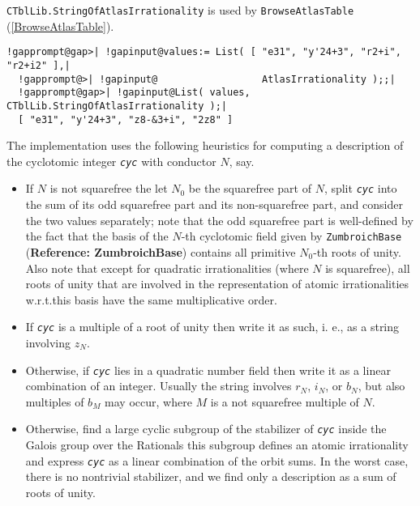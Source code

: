 \documentclass[a4paper,11pt]{report}
\begin{document}
{{{ \texttt{CTblLib.StringOfAtlasIrrationality} is used by \texttt{BrowseAtlasTable} (\ref{BrowseAtlasTable}). 

 
\begin{Verbatim}[commandchars=!@|,fontsize=\small,frame=single,label=Example]
  !gapprompt@gap>| !gapinput@values:= List( [ "e31", "y'24+3", "r2+i", "r2+i2" ],|
  !gapprompt@>| !gapinput@                  AtlasIrrationality );;|
  !gapprompt@gap>| !gapinput@List( values, CTblLib.StringOfAtlasIrrationality );|
  [ "e31", "y'24+3", "z8-&3+i", "2z8" ]
\end{Verbatim}
 

 The implementation uses the following heuristics for computing a description
of the cyclotomic integer \mbox{\texttt{\mdseries\slshape cyc}} with conductor $N$, say. 

 
\begin{itemize}
\item  If $N$ is not squarefree the let $N_0$ be the squarefree part of $N$, split \mbox{\texttt{\mdseries\slshape cyc}} into the sum of its odd squarefree part and its non-squarefree part, and
consider the two values separately; note that the odd squarefree part is
well-defined by the fact that the basis of the $N$-th cyclotomic field given by \texttt{ZumbroichBase} (\textbf{Reference: ZumbroichBase}) contains all primitive $N_0$-th roots of unity. Also note that except for quadratic irrationalities (where $N$ is squarefree), all roots of unity that are involved in the representation of
atomic irrationalities w.{\nobreakspace}r.{\nobreakspace}t.{\nobreakspace}this
basis have the same multiplicative order. 
\item  If \mbox{\texttt{\mdseries\slshape cyc}} is a multiple of a root of unity then write it as such, i. e., as a string
involving $z_N$. 
\item  Otherwise, if \mbox{\texttt{\mdseries\slshape cyc}} lies in a quadratic number field then write it as a linear combination of an
integer. Usually the string involves $r_N$, $i_N$, or $b_N$, but also multiples of $b_M$ may occur, where $M$ is a {\textendash}not squarefree{\textendash} multiple of $N$. 
\item  Otherwise, find a large cyclic subgroup of the stabilizer of \mbox{\texttt{\mdseries\slshape cyc}} inside the Galois group over the Rationals {\textendash}this subgroup defines
an atomic irrationality{\textendash} and express \mbox{\texttt{\mdseries\slshape cyc}} as a linear combination of the orbit sums. In the worst case, there is no
nontrivial stabilizer, and we find only a description as a sum of roots of
unity. 
\end{itemize}
 

}}}
\end{document}

